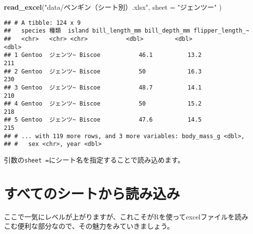 \documentclass[
  xelatex,ja=standard, b5paper]{bxjsbook}
\newenvironment{Shaded}{\begin{snugshade}}{\end{snugshade}}
\newcommand{\CommentTok}[1]{\textcolor[rgb]{0.56,0.35,0.01}{\textit{#1}}}
\newcommand{\DataTypeTok}[1]{\textcolor[rgb]{0.13,0.29,0.53}{#1}}
\newcommand{\KeywordTok}[1]{\textcolor[rgb]{0.13,0.29,0.53}{\textbf{#1}}}
\newcommand{\NormalTok}[1]{#1}
\newcommand{\OperatorTok}[1]{\textcolor[rgb]{0.81,0.36,0.00}{\textbf{#1}}}
\newcommand{\StringTok}[1]{\textcolor[rgb]{0.31,0.60,0.02}{#1}}
\begin{document}
\begin{Shaded}
\begin{Highlighting}[]
\KeywordTok{read_excel}\NormalTok{(}\StringTok{"data/ペンギン（シート別）.xlsx"}\NormalTok{, }\DataTypeTok{sheet =} \StringTok{"ジェンツー"}\NormalTok{ )}
\end{Highlighting}
\end{Shaded}

\begin{verbatim}
## # A tibble: 124 x 9
##   species 種類  island bill_length_mm bill_depth_mm flipper_length_~
##   <chr>   <chr> <chr>           <dbl>         <dbl>            <dbl>
## 1 Gentoo  ジェンツ~ Biscoe           46.1          13.2              211
## 2 Gentoo  ジェンツ~ Biscoe           50            16.3              230
## 3 Gentoo  ジェンツ~ Biscoe           48.7          14.1              210
## 4 Gentoo  ジェンツ~ Biscoe           50            15.2              218
## 5 Gentoo  ジェンツ~ Biscoe           47.6          14.5              215
## # ... with 119 more rows, and 3 more variables: body_mass_g <dbl>,
## #   sex <chr>, year <dbl>
\end{verbatim}

引数の\texttt{sheet\ =}にシート名を指定することで読み込めます。

\hypertarget{dflist}{%
\section{すべてのシートから読み込み}\label{dflist}}

ここで一気にレベルが上がりますが、これこそがRを使ってexcelファイルを読みこむ便利な部分なので、その魅力をみていきましょう。

\begin{Shaded}
\end{Shaded}
\end{document}
